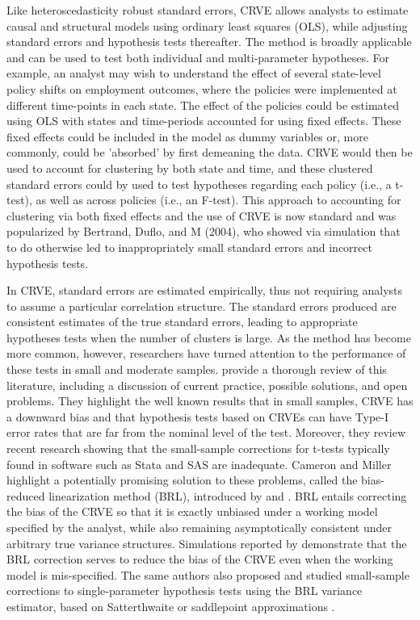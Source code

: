 \documentclass[12pt]{article}
\begin{document}
Like heteroscedasticity robust standard errors, CRVE allows analysts to estimate causal and structural models using ordinary least squares (OLS), while adjusting standard errors and hypothesis tests thereafter.
The method is broadly applicable and can be used to test both individual and multi-parameter hypotheses.
For example, an analyst may wish to understand the effect of several state-level policy shifts on employment outcomes, where the policies were implemented at different time-points in each state. 
The effect of the policies could be estimated using OLS with states and time-periods accounted for using fixed effects.
These fixed effects could be included in the model as dummy variables or, more commonly, could be 'absorbed' by first demeaning the data.
CRVE would then be used to account for clustering by both state and time, and these clustered standard errors could by used to test hypotheses regarding each policy (i.e., a t-test), as well as across policies (i.e., an F-test).
This approach to accounting for clustering via both fixed effects and the use of CRVE is now standard and was popularized by Bertrand, Duflo, and M (2004), who showed via simulation that to do otherwise led to inappropriately small standard errors and incorrect hypothesis tests. 

In CRVE, standard errors are estimated empirically, thus not requiring analysts to assume a particular correlation structure.
The standard errors produced are consistent estimates of the true standard errors, leading to appropriate hypotheses tests when the number of clusters is large.
As the method has become more common, however, researchers have turned attention to the performance of these tests in small and moderate samples. 
\citet{Cameron2015practitioners} provide a thorough review of this literature, including a discussion of current practice, possible solutions, and open problems. 
They highlight the well known results that in small samples, CRVE has a downward bias and that hypothesis tests based on CRVEs can have Type-I error rates that are far from the nominal level of the test.
Moreover, they review recent research showing that the small-sample corrections for t-tests typically found in software such as Stata and SAS are inadequate. 
Cameron and Miller highlight a potentially promising solution to these problems, called the bias-reduced linearization method (BRL), introduced by \citet{McCaffrey2001generalizations} and \citet{Bell2002bias}. 
BRL entails correcting the bias of the CRVE so that it is exactly unbiased under a working model specified by the analyst, while also remaining asymptotically consistent under arbitrary true variance structures. 
Simulations reported by \citet{Bell2002bias} demonstrate that the BRL correction serves to reduce the bias of the CRVE even when the working model is mis-specified. 
The same authors also proposed and studied small-sample corrections to single-parameter hypothesis tests using the BRL variance estimator, based on Satterthwaite \citep{Bell2002bias} or saddlepoint approximations \citep{McCaffrey2006improved}.
\end{document}

